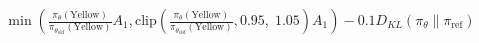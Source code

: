 \documentclass[preview]{standalone}
\begin{document}
\begin{align*}
\min \left(\frac{\pi_\theta(\text{Yellow})}{\pi_{\theta_{\text{old}}}(\text{Yellow})} A_1, \text{clip} \left( \frac{\pi_\theta(\text{Yellow})}{\pi_{\theta_{\text{old}}}(\text{Yellow})}, 0.95,\; 1.05 \right) A_1 \right) - 0.1 D_{KL}(\pi_\theta \parallel \pi_{\text{ref}})
\end{align*}
\end{document}
